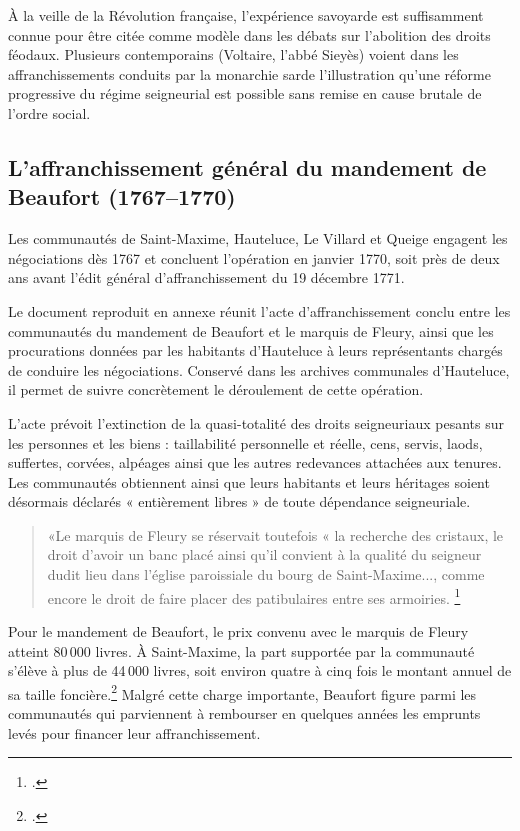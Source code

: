 \documentclass[12pt,a4paper]{report}
\begin{document}
À la veille de la Révolution française, l'expérience savoyarde est suffisamment connue pour être citée comme modèle dans les débats sur l'abolition des droits féodaux. Plusieurs contemporains (Voltaire, l'abbé Sieyès) voient dans les affranchissements conduits par la monarchie sarde l'illustration qu'une réforme progressive du régime seigneurial est possible sans remise en cause brutale de l'ordre social.

\subsection{L'affranchissement général du mandement de Beaufort (1767--1770)}

Les communautés de Saint-Maxime, Hauteluce, Le Villard et Queige engagent les négociations dès 1767 et concluent l'opération en janvier 1770, soit près de deux ans avant l'édit général d'affranchissement du 19 décembre 1771.

Le document reproduit en annexe réunit l'acte d'affranchissement conclu entre les communautés du mandement de Beaufort et le marquis de Fleury, ainsi que les procurations données par les habitants d'Hauteluce à leurs représentants chargés de conduire les négociations. Conservé dans les archives communales d'Hauteluce, il permet de suivre concrètement le déroulement de cette opération.



L'acte prévoit l'extinction de la quasi-totalité des droits seigneuriaux pesants sur les personnes et les biens : taillabilité personnelle et réelle, cens, servis, laods, suffertes, corvées, alpéages ainsi que les autres redevances attachées aux tenures. Les communautés obtiennent ainsi que leurs habitants et leurs héritages soient désormais déclarés « entièrement libres » de toute dépendance seigneuriale.
\begin{quote}
	«Le marquis de Fleury se réservait toutefois « la recherche des cristaux, le droit d'avoir un banc placé ainsi qu'il convient à la qualité du seigneur dudit lieu dans l'église paroissiale du bourg de Saint-Maxime..., comme encore le droit de faire placer des patibulaires entre ses armoiries.	\footcite[426]{Bruchet1908Abolition}
\end{quote}

Pour le mandement de Beaufort, le prix convenu avec le marquis de Fleury atteint 80\,000 livres. À Saint-Maxime, la part supportée par la communauté s'élève à plus de 44\,000 livres, soit environ quatre à cinq fois le montant annuel de sa taille foncière.\footcite[LXXXI, 426]{Bruchet1908Abolition} Malgré cette charge importante, Beaufort figure parmi les communautés qui parviennent à rembourser en quelques années les emprunts levés pour financer leur affranchissement.
\end{document}
